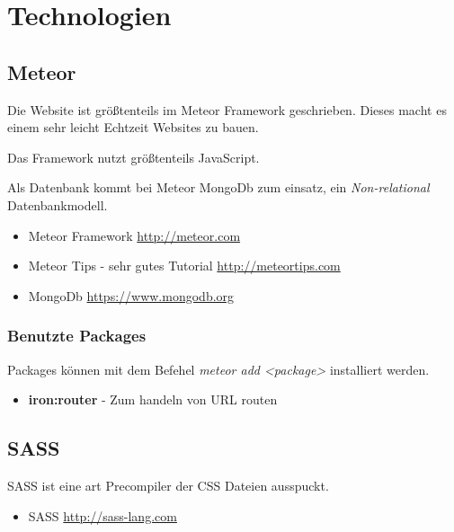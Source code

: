 \documentclass[Info_VK_Website_Dokumentation.tex]{subfiles}
\begin{document}
	
\chapter{Technologien}

\section{Meteor} 

Die Website ist größtenteils im Meteor Framework geschrieben. Dieses macht es einem sehr leicht Echtzeit Websites zu bauen.

Das Framework nutzt größtenteils JavaScript.

Als Datenbank kommt bei Meteor MongoDb zum einsatz, ein \emph{Non-relational} Datenbankmodell.

\begin{itemize}
 	\item Meteor Framework \url{http://meteor.com} \\
 	\item Meteor Tips - sehr gutes Tutorial \url{http://meteortips.com} \\
 	\item MongoDb \url{https://www.mongodb.org} \\ 
\end{itemize} 

\subsection{Benutzte Packages}

Packages können mit dem Befehel \emph{meteor add <package>} installiert werden.

\begin{itemize}
 	\item \textbf{iron:router} - Zum handeln von URL routen \\
 \end{itemize} 

\section{SASS}

SASS ist eine art Precompiler der CSS Dateien ausspuckt.

\begin{itemize}
	\item SASS \url{http://sass-lang.com} 
\end{itemize}
\end{document}
